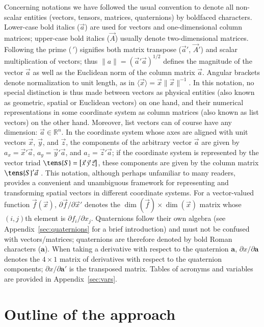 \documentclass[structabstract]{aa}
\newcommand{\quat}[1]{\mathbf{#1}}
\begin{document}
Concerning notations we have followed the usual convention to denote
all non-scalar entities (vectors, tensors, matrices, quaternions) by
boldfaced characters.
Lower-case bold italics ($\vec{a}$) are used for vectors and one-dimensional
column matrices; upper-case bold italics ($\vec{A}$) usually denote
two-dimensional matrices. Following \citet{murray1983} the prime
($\,'$) signifies both matrix transpose ($\vec{a}'$, $\vec{A}'$) and
scalar multiplication of vectors; thus $\lVert a \rVert=(\vec{a}'\!\vec{a})^{1/2}$
defines the magnitude of the vector $\vec{a}$ as well as the Euclidean
norm of the column matrix $\vec{a}$. 
Angular brackets denote normalization to unit length, as in
$\langle\vec{x}\rangle=\vec{x}\lVert\vec{x}\rVert^{-1}$.
In this notation, no special distinction is thus made between vectors 
as physical entities (also known as geometric, spatial or Euclidean vectors) 
on one hand, and their numerical representations in some coordinate system 
as column matrices (also known as list vectors) on the other hand. Moreover,
list vectors can of course have any dimension: $\vec{a}\in\mathbb{R}^n$.
In the coordinate system whose axes are aligned with unit vectors 
$\vec{x}$, $\vec{y}$, and $\vec{z}$, the components of the arbitrary 
vector $\vec{a}$ are given by $a_x=\vec{x}'\vec{a}$, $a_y=\vec{y}'\vec{a}$, 
and $a_z=\vec{z}'\vec{a}$; if the coordinate system is represented by the
vector triad $\tens{S}=\left[\vec{x}~\vec{y}~\vec{z}\right]$, these
components are given by the column matrix
$\tens{S}'\vec{a}$ \citep[cf.\ Appendix~A in][]{murray1983}. 
This notation, although perhaps unfamiliar to many readers, provides
a convenient and unambiguous framework for representing and
transforming spatial vectors in different coordinate systems.
For a vector-valued function
$\vec{f}(\vec{x})$, $\partial\vec{f}/\partial\vec{x}'$ denotes the
$\dim(\vec{f})\times\dim(\vec{x})$ matrix whose $(i,j)$th element
is $\partial f_i/\partial x_j$. 
Quaternions follow their own algebra
(see Appendix~\ref{sec:quaternions} for a brief introduction) and must
not be confused with vectors/matrices; quaternions are therefore denoted
by bold Roman characters ($\quat{a}$). When taking a
derivative with respect to the quaternion $\quat{a}$,
$\partial x/\partial\quat{a}$ denotes the $4\times 1$ matrix of
derivatives with respect to the quaternion components;
$\partial x/\partial\quat{a}'$ is the transposed matrix.
Tables of acronyms and variables are provided in Appendix~\ref{sec:vars}.

\section{Outline of the approach}\label{sec:outline}
\end{document}

